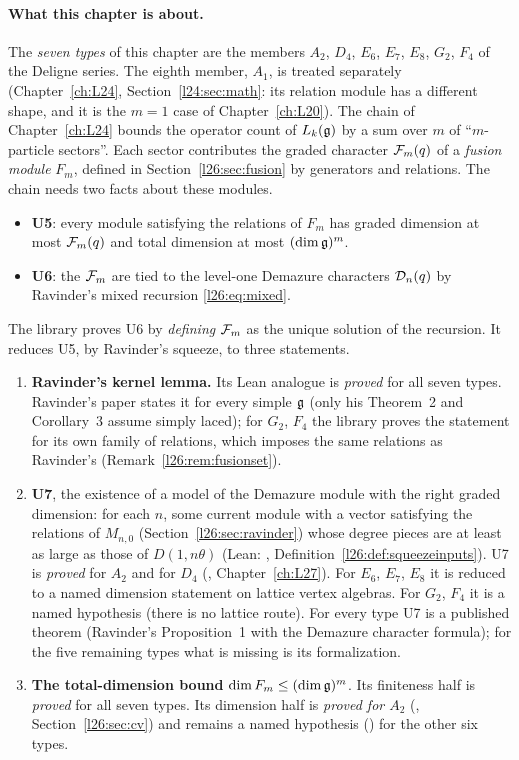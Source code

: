 \paragraph{What this chapter is about.} The \emph{seven types} of this chapter are the members
$A_2$, $D_4$, $E_6$, $E_7$, $E_8$, $G_2$, $F_4$ of the Deligne series. The eighth member, $A_1$, is treated separately
(Chapter~\ref{ch:L24}, Section~\ref{l24:sec:math}: its relation module has a different shape, and it is the $m=1$ case of
Chapter~\ref{ch:L20}). The chain of Chapter~\ref{ch:L24} bounds the operator count of $L_k(\mathfrak g)$ by a sum over
$m$ of ``$m$-particle sectors''. Each sector contributes the graded character $\mathcal F_m(q)$ of a \emph{fusion module}
$F_m$, defined in Section~\ref{l26:sec:fusion} by generators and relations. The chain needs two facts about these modules.
\begin{itemize}
\item \textbf{U5}: every module satisfying the relations of $F_m$ has graded dimension at most $\mathcal F_m(q)$ and total
  dimension at most $(\dim\mathfrak g)^m$.
\item \textbf{U6}: the $\mathcal F_m$ are tied to the level-one Demazure characters $\mathcal D_n(q)$ by Ravinder's mixed
  recursion \eqref{l26:eq:mixed}.
\end{itemize}
The library proves U6 by \emph{defining} $\mathcal F_m$ as the unique solution of the recursion. It reduces U5, by
Ravinder's squeeze, to three statements.
\begin{enumerate}
\item[(i)] \textbf{Ravinder's kernel lemma.} Its Lean analogue is \emph{proved} for all seven types. Ravinder's paper
  states it for every simple $\mathfrak g$ (only his Theorem~2 and Corollary~3 assume simply laced); for $G_2$, $F_4$ the
  library proves the statement for its own family of relations, which imposes the same relations as Ravinder's
  (Remark~\ref{l26:rem:fusionset}).
\item[(ii)] \textbf{U7}, the existence of a model of the Demazure module with the right graded dimension: for each $n$, some
  current module with a vector satisfying the relations of $M_{n,0}$ (Section~\ref{l26:sec:ravinder}) whose degree pieces
  are at least as large as those of $D(1,n\theta)$ (Lean: , Definition~\ref{l26:def:squeezeinputs}).
  U7 is \emph{proved} for $A_2$ and for $D_4$ (, Chapter~\ref{ch:L27}). For $E_6$, $E_7$,
  $E_8$ it is reduced to a named dimension statement on lattice vertex algebras. For $G_2$, $F_4$ it is a named hypothesis
  (there is no lattice route). For every type U7 is a published theorem (Ravinder's Proposition~1 with the Demazure character
  formula); for the five remaining types what is missing is its formalization.
\item[(iii)] \textbf{The total-dimension bound} $\dim F_m\le(\dim\mathfrak g)^m$. Its finiteness half is \emph{proved} for
  all seven types. Its dimension half is \emph{proved for $A_2$} (, Section~\ref{l26:sec:cv}) and
  remains a named hypothesis () for the other six types.
\end{enumerate}
